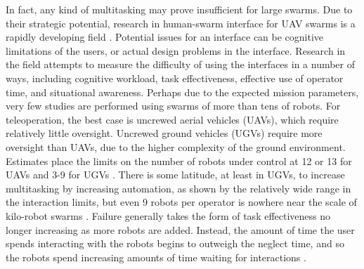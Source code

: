 In fact, any kind of multitasking may prove insufficient for large swarms. 
Due to their strategic potential, research in human-swarm interface for UAV swarms is a rapidly developing field \citep{hocraffer2017meta}. 
Potential issues for an interface can be cognitive limitations of the users, or actual design problems in the interface. 
Research in the field attempts to measure the difficulty of using the interfaces in a number of ways, including cognitive workload, task effectiveness, effective use of operator time, and situational awareness. 
Perhaps due to the expected mission parameters, very few studies are performed using swarms of more than tens of robots. 
For teleoperation, the best case is uncrewed aerial vehicles (UAVs), which require relatively little oversight. 
Uncrewed ground vehicles (UGVs) require more oversight than UAVs, due to the higher complexity of the ground environment. 
Estimates place the limits on the number of robots under control at 12 or 13 for UAVs and 3-9 for UGVs \citep{WangSearchScale}.  
There is some latitude, at least in UGVs, to increase multitasking by increasing automation, as shown by the relatively wide range in the interaction limits, but even 9 robots per operator is nowhere near the scale of kilo-robot swarms  \citep{Olsen:2004:FMH:985692.985722}.
Failure generally takes the form of task effectiveness no longer increasing as more robots are added.
Instead, the amount of time the user spends interacting with the robots begins to outweigh the neglect time, and so the robots spend increasing amounts of time waiting for interactions \citep{cummings2008predicting}. 

